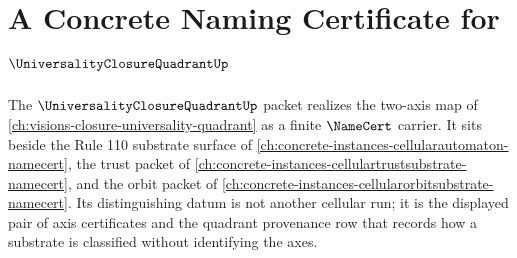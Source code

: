 \chapter{A Concrete Naming Certificate for $\UniversalityClosureQuadrantUp$}
\label{ch:concrete-instances-universality-closure-quadrant-namecert}

The $\UniversalityClosureQuadrantUp$ packet realizes the two-axis map of \autoref{ch:visions-closure-universality-quadrant} as a finite $\NameCert$ carrier. It sits beside the Rule 110 substrate surface of \autoref{ch:concrete-instances-cellularautomaton-namecert}, the trust packet of \autoref{ch:concrete-instances-cellulartrustsubstrate-namecert}, and the orbit packet of \autoref{ch:concrete-instances-cellularorbitsubstrate-namecert}. Its distinguishing datum is not another cellular run; it is the displayed pair of axis certificates and the quadrant provenance row that records how a substrate is classified without identifying the axes.



